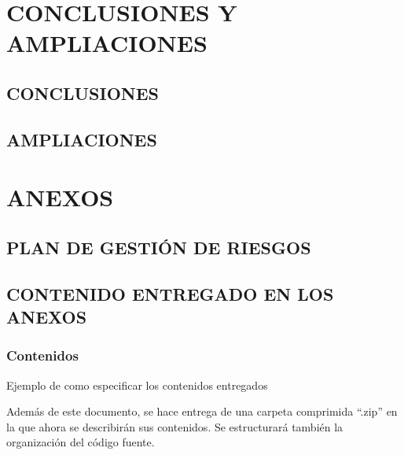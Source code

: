 \documentclass[11pt]{report}
\begin{document}
\newpage
\chapter{CONCLUSIONES Y AMPLIACIONES}
\newpage

\section{CONCLUSIONES}

\newpage
\section{AMPLIACIONES} 


\newpage
\chapter*{ANEXOS}
\newpage
{}
\section*{PLAN DE GESTIÓN DE RIESGOS}

\newpage
\section*{CONTENIDO ENTREGADO EN LOS ANEXOS} 

\subsection*{Contenidos} 

\textcolor[rgb]{0.65,0.16,0}{Ejemplo de como especificar los contenidos entregados}

Además de este documento, se hace entrega de una carpeta comprimida ``.zip'' en la que ahora se describirán sus contenidos. Se estructurará también la organización del código fuente.
\end{document}
